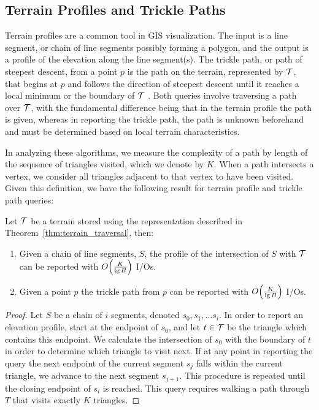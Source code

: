 {  \subsection{Terrain Profiles and Trickle Paths}\label{ssec:ter_profile_tpath}

  Terrain profiles are a common tool in GIS visualization. 
  The input is a line segment, or chain of line segments possibly forming a polygon, 
  and the output is a profile of the elevation along the line segment(s). 
  The trickle path, or path of steepest descent, from a point $p$ is the path on
  the terrain, represented by $\mathcal{T}$, 
  that begins at $p$ and follows the direction of steepest descent until it reaches 
  a local minimum or the boundary of $\mathcal{T}$ \cite{DBLP:conf/cccg/BergBDKOGRSY96}. 
  Both queries involve traversing a path over $\mathcal{T}$, with the fundamental 
  difference being that in the terrain profile the path is given, whereas in 
  reporting the trickle path, the path is unknown beforehand and must be 
  determined based on local terrain characteristics.

  In analyzing these algorithms, we measure the complexity of a path by length 
  of the sequence of triangles visited, which we denote by $K$. 
  When a path intersects a vertex, we consider all triangles adjacent to that 
  vertex to have been visited. 
  Given this definition, we have the following result for terrain profile and 
  trickle path queries:

  \begin{lemma}\label{lem:tprofile_tpath}
  Let $\mathcal{T}$ be a terrain stored using the representation described
  in Theorem~\ref{thm:terrain_traversal}, then:
  \begin{enumerate}[label={(\alph{*})}]
  \item{ Given a chain of line segments, $S$, the profile of the intersection 
  of $S$ with $\mathcal{T}$ can be reported with $O\!\left( \frac{K}{\lg{B}} \right)$ I/Os.}
  \item{ Given a point $p$ the trickle path from $p$ can be reported with 
  $O\!\left( \frac{K}{\lg{B}} \right)$ I/Os.}
  \end{enumerate}
  \end{lemma}

  \begin{proof}
  Let $S$ be a chain of $i$ segments, denoted $s_0, s_1, \ldots s_i$. 
  In order to report an elevation profile, start at the endpoint of $s_0$, and 
  let $t \in \mathcal{T}$ be the triangle which contains this endpoint. 
  We calculate the intersection of $s_0$ with the boundary of $t$ in order to determine 
  which triangle to visit next. 
  If at any point in reporting the query the next endpoint of the current segment 
  $s_j$ falls within the current triangle, we advance to the next segment 
  $s_{j+1}$. 
  This procedure is repeated until the closing endpoint of $s_i$ is reached.
  This query requires walking a path through $T$ that visits exactly $K$ triangles.


\end{proof}}
